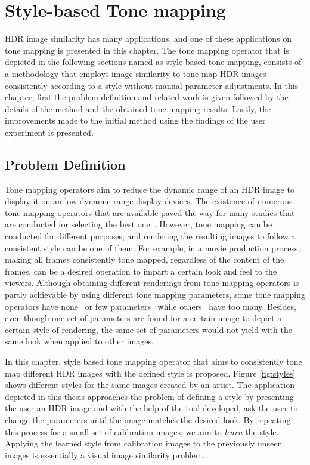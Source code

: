 \chapter{Style-based Tone mapping}
\label{chp:b5}

HDR image similarity has many applications, and one of these applications on tone mapping is presented in this chapter. The tone mapping operator that is depicted in the following sections named as style-based tone mapping, consists of a methodology that employs image similarity to tone map HDR images consistently according to a style without manual parameter adjustments. In this chapter, first the problem definition and related work is given followed by the details of the method and the obtained tone mapping results. Lastly, the improvements made to the initial method using the findings of the user experiment is presented.

\section{Problem Definition}

Tone mapping operators aim to reduce the dynamic range of an HDR image to display it on an low dynamic range display devices. The existence of numerous tone mapping operators that are available paved the way for many studies that are conducted for selecting the best one~\cite{parraga2018tone}. However, tone mapping can be conducted for different purposes, and rendering the resulting images to follow a consistent style can be one of them. For example, in a movie production process, making all frames consistently tone mapped, regardless of the content of the frames, can be a desired operation to impart a certain look and feel to the viewers. Although obtaining different renderings from tone mapping operators is partly achievable by using different tone mapping parameters, some tone mapping operators have none~\cite{Dura02} or few parameters~\cite{Fatt02} while others~\cite{Photomatix2010} have too many. Besides, even though one set of parameters are found for a certain image to depict a certain style of rendering, the same set of parameters would not yield with the same look when applied to other images. %

In this chapter, style based tone mapping operator that aims to consistently tone map different HDR images with the defined style is proposed. Figure \ref{fig:styles} shows different styles for the same images created by an artist. The application depicted in this thesis approaches the problem of defining a style by presenting the user an HDR image and with the help of the tool developed, ask the user to change the parameters until the image matches the desired look. By repeating this process for a small set of calibration images, we aim to \emph{learn} the style. Applying the learned style from calibration images to the previously unseen images is essentially a visual image similarity problem.

